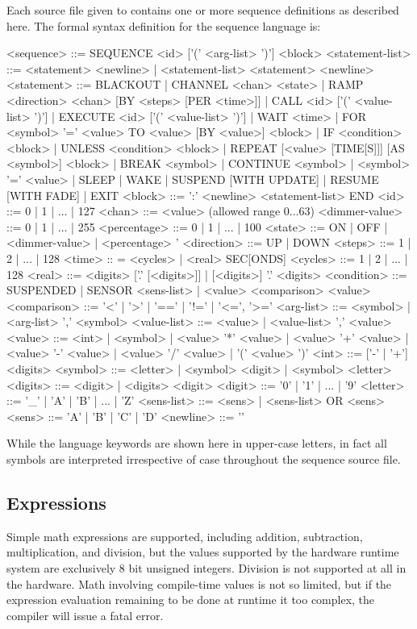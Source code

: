 Each source file given to 
contains one or more sequence definitions as described here.  The formal syntax
definition for the sequence language is:
\begin{SourceCode}
<sequence> ::= SEQUENCE <id> ['(' <arg-list> ')'] <block>
<statement-list> ::= <statement> <newline> 
    | <statement-list> <statement> <newline>
<statement> ::= BLACKOUT
    | CHANNEL <chan> <state>
    | RAMP <direction> <chan> [BY <steps> [PER <time>]]
    | CALL <id> ['(' <value-list> ')']
    | EXECUTE <id> ['(' <value-list> ')']
    | WAIT <time>
    | FOR <symbol> '=' <value> TO <value> [BY <value>] <block>
    | IF <condition> <block>
    | UNLESS <condition> <block>
    | REPEAT [<value> [TIME[S]]] [AS <symbol>] <block>
    | BREAK <symbol>
    | CONTINUE <symbol>
    | <symbol> '=' <value>
    | SLEEP
    | WAKE
    | SUSPEND [WITH UPDATE]
    | RESUME [WITH FADE]
    | EXIT
<block> ::= ':' <newline> <statement-list> END
<id> ::= 0 | 1 | ... | 127
<chan> ::= <value> (allowed range 0...63)
<dimmer-value> ::= 0 | 1 | ... | 255
<percentage> ::= 0 | 1 | ... | 100
<state> ::= ON | OFF | <dimmer-value> | <percentage> '%
<direction> ::= UP | DOWN
<steps> ::= 1 | 2 | ... | 128
<time> :: = <cycles> | <real> SEC[ONDS]
<cycles> ::= 1 | 2 | ... | 128
<real> ::= <digits> ['.' [<digits>]] | [<digits>] '.' <digits>
<condition> ::= SUSPENDED
    | SENSOR <sens-list>
    | <value> <comparison> <value>
<comparison> ::= '<' | '>' | '==' | '!=' | '<=', '>='
<arg-list> ::= <symbol> | <arg-list> ',' <symbol>
<value-list> ::= <value> | <value-list> ',' <value>
<value> ::= <int> 
    | <symbol>
    | <value> '*' <value>
    | <value> '+' <value>
    | <value> '-' <value>
    | <value> '/' <value>
    | '(' <value> ')'
<int> ::= ['-' | '+'] <digits>
<symbol> ::= <letter> | <symbol> <digit> | <symbol> <letter>
<digits> ::= <digit> | <digits> <digit>
<digit> ::= '0' | '1' | ... | '9'
<letter> ::= '_' | 'A' | 'B' | ... | 'Z'
<sens-list> ::= <sens> | <sens-list> OR <sens>
<sens> ::= 'A' | 'B' | 'C' | 'D'
<newline> ::= '\n'
\end{SourceCode}


While the language keywords are shown here in upper-case letters,
in fact all symbols are interpreted irrespective of case throughout
the sequence source file.


\subsection*{Expressions}
Simple math expressions are supported, including addition, subtraction,
multiplication, and division, but the values supported by the hardware
runtime system are exclusively 8 bit unsigned integers.  Division is not
supported at all in the hardware.  Math involving compile-time values
is not so limited, but if the expression evaluation remaining to be done
at runtime it too complex, the compiler will issue a fatal error.
